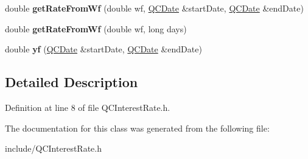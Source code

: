 \begin{DoxyCompactItemize}
\item 
\hypertarget{class_q_c_interest_rate_aee3f65ca6b55dab624646985171f9032}{double {\bfseries get\+Rate\+From\+Wf} (double wf, \hyperlink{class_q_c_date}{Q\+C\+Date} \&start\+Date, \hyperlink{class_q_c_date}{Q\+C\+Date} \&end\+Date)}\label{class_q_c_interest_rate_aee3f65ca6b55dab624646985171f9032}

\item 
\hypertarget{class_q_c_interest_rate_ac694edd3bd07d3538ef8a37fd19cd3ba}{double {\bfseries get\+Rate\+From\+Wf} (double wf, long days)}\label{class_q_c_interest_rate_ac694edd3bd07d3538ef8a37fd19cd3ba}

\item 
\hypertarget{class_q_c_interest_rate_a8370686c8615f04bfa39560bba1488a1}{double {\bfseries yf} (\hyperlink{class_q_c_date}{Q\+C\+Date} \&start\+Date, \hyperlink{class_q_c_date}{Q\+C\+Date} \&end\+Date)}\label{class_q_c_interest_rate_a8370686c8615f04bfa39560bba1488a1}

\end{DoxyCompactItemize}


\subsection{Detailed Description}


Definition at line 8 of file Q\+C\+Interest\+Rate.\+h.



The documentation for this class was generated from the following file\+:\begin{DoxyCompactItemize}
\item 
include/Q\+C\+Interest\+Rate.\+h\end{DoxyCompactItemize}
